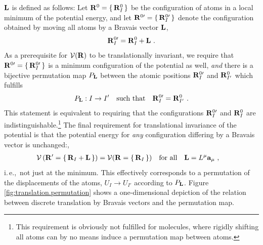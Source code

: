 $\bf L$ is defined as follows:
Let ${\bf R}^0 = \set{{\bf R}_I^0}$ be the configuration of atoms in a local minimum of the potential energy, and let ${\bf R}^{0 \prime} = \set{{\bf R}^{0 \prime}_{I}}$ denote the configuration obtained by moving all atoms by a Bravais vector ${\bf L}$,
\begin{align}
	{\bf R}^{0 \prime}_{I} = {\bf R}^0_{I} + {\bf L}~.
	\label{eq:RI'}
\end{align}
As a prerequisite for $\mathcal V ({\bf R})$ to be translationally invariant, we require that ${\bf R}^{0 \prime} = \set{{\bf R}^{0 \prime}_{I}}$ is a minimum configuration of the potential as well, \emph{and} there is a bijective permutation map $P_{\bf L}$ between the atomic positions ${\bf R}^{0 \prime}_{I}$ and ${\bf R}^{0}_{I'}$ which fulfills
\begin{align}
	P_{\bf L} : I \to I' \quad\text{such that}\quad
	{\bf R}^{0 \prime}_{I}
		= {\bf R}^{0}_{I'}~.
	\label{eq:translation.permutation}
\end{align}
This statement is equivalent to requiring that the configurations ${\bf R}^{0 \prime}_{I}$ and ${\bf R}^{0}_{I}$ are indistinguishable.\footnote{This requirement is obviously not fulfilled for molecules, where rigidly shifting all atoms can by no means induce a permutation map between atoms.} 
The final requirement for translational invariance of the potential is that the potential energy for \emph{any} configuration differing by a Bravais vector is unchanged:,
\begin{align}
	\mathcal{V} \left( {\bf R}' = \set{{\bf R}_{I} + {\bf L}} \right)
	&= \mathcal{V}({\bf R} = \set{{\bf R}_{I}} ) 
	\quad\text{for all}\quad {\bf L} = L^\mu {\bf a}_\mu~,
	\label{eq:inv.V}
\end{align}
i.\,e.,~not just at the minimum. This effectively corresponds to a permutation of the displacements of the atoms, $U_I \to U_{I'}$ according to $P_{\bf L}$. Figure\,\ref{fig:translation.permutation} shows a one-dimensional depiction of the relation between discrete translation by Bravais vectors and the permutation map.
